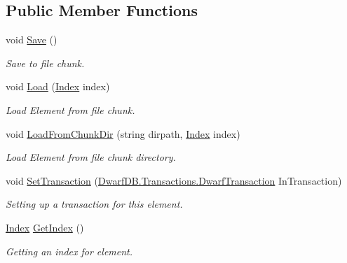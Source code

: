 \subsection*{Public Member Functions}
\begin{DoxyCompactItemize}
\item 
void \hyperlink{interface_dwarf_d_b_1_1_data_structures_1_1_i_structure_aa97bbd5250cf7456849fa6ca6ffcc0b4}{Save} ()
\begin{DoxyCompactList}\small\item\em Save to file chunk. \item\end{DoxyCompactList}\item 
void \hyperlink{interface_dwarf_d_b_1_1_data_structures_1_1_i_structure_acc1c091913384168ec50edad8b94b94b}{Load} (\hyperlink{class_dwarf_d_b_1_1_data_structures_1_1_index}{Index} index)
\begin{DoxyCompactList}\small\item\em Load Element from file chunk. \item\end{DoxyCompactList}\item 
void \hyperlink{interface_dwarf_d_b_1_1_data_structures_1_1_i_structure_a2e187a88a03b9e81e6e602be9329a395}{LoadFromChunkDir} (string dirpath, \hyperlink{class_dwarf_d_b_1_1_data_structures_1_1_index}{Index} index)
\begin{DoxyCompactList}\small\item\em Load Element from file chunk directory. \item\end{DoxyCompactList}\item 
void \hyperlink{interface_dwarf_d_b_1_1_data_structures_1_1_i_structure_aa89d0ecc5915538b89865bc3086d8b0a}{SetTransaction} (\hyperlink{class_dwarf_d_b_1_1_transactions_1_1_dwarf_transaction}{DwarfDB.Transactions.DwarfTransaction} InTransaction)
\begin{DoxyCompactList}\small\item\em Setting up a transaction for this element. \item\end{DoxyCompactList}\item 
\hyperlink{class_dwarf_d_b_1_1_data_structures_1_1_index}{Index} \hyperlink{interface_dwarf_d_b_1_1_data_structures_1_1_i_structure_a6fb14f0bf9df3268084bcc31dfd9c56f}{GetIndex} ()
\begin{DoxyCompactList}\small\item\em Getting an index for element. \item\end{DoxyCompactList}\item 

\end{DoxyCompactItemize}

